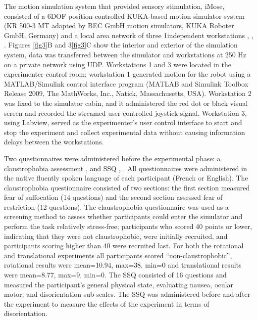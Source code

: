 \documentclass{ieeeaccess}
\begin{document}
\indent The motion simulation system that provided sensory stimulation, iMose, consisted of a 6DOF position-controlled KUKA-based motion simulator system (KR 500-3 MT adapted by BEC GmbH motion simulators, KUKA Roboter GmbH, Germany) and a local area network of three 1independent workstations \cite{Denquin_2021_LAF}, \cite{Landrieu_2017_Timetocollision}, \cite{Bellmann_2011_DLR}. Figures \ref{fig3}B and 3\ref{fig3}C show the interior and exterior of the simulation system, data was transferred between the simulator and workstations at 250 Hz on a private network using UDP. Workstations 1 and 3 were located in the experimenter control room; workstation 1 generated motion for the robot using a MATLAB/Simulink control interface program (MATLAB and Simulink Toolbox Release 2009, The MathWorks, Inc., Natick, Massachusetts, USA). Workstation 2 was fixed to the simulator cabin, and it administered the red dot or black visual screen and recorded the streamed user-controlled joystick signal. Workstation 3, using Labview, served as the experimenter’s user control interface to start and stop the experiment and collect experimental data without causing information delays between the workstations.

\indent Two questionnaires were administered before the experimental phase: a claustrophobia assessment \cite{Radomsky_2001_Claustrophobia}, \cite{Radomsky_2006_Claustrophobia_CLQ} and SSQ \cite{Kennedy_1993_Simulator}, \cite{Bouchard_2007_SimulatorSickness}. All questionnaires were administered in the native fluently spoken language of each participant (French or English). The claustrophobia questionnaire consisted of two sections: the first section measured fear of suffocation (14 questions) and the second section assessed fear of restriction (12 questions). The claustrophobia questionnaire was used as a screening method to assess whether participants could enter the simulator and perform the task relatively stress-free; participants who scored 40 points or lower, indicating that they were not claustrophobic, were initially recruited, and participants scoring higher than 40 were recruited last. For both the rotational and translational experiments all participants scored “non-claustrophobic”, rotational results were mean=10.94, max=38, min=0 and translational results were mean=8.77, max=9, min=0. The SSQ consisted of 16 questions and measured the participant’s general physical state, evaluating nausea, ocular motor, and disorientation sub-scales. The SSQ was administered before and after the experiment to measure the effects of the experiment in terms of disorientation.
\end{document}
